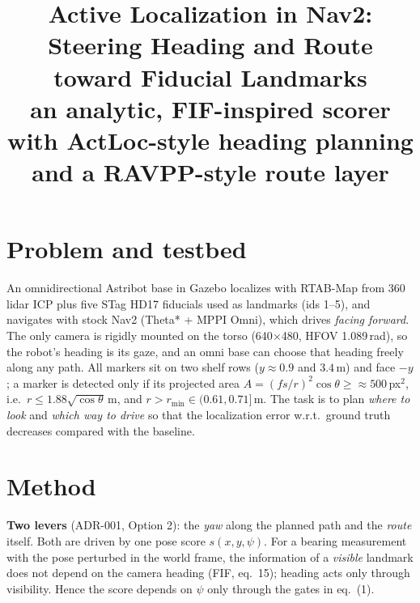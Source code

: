 \documentclass[10pt,twocolumn]{article}
\title{\vspace{-1.2cm}\large\bfseries Active Localization in Nav2: Steering Heading and Route toward Fiducial Landmarks\\[-2pt]
  {\normalsize\mdseries an analytic, FIF-inspired scorer with ActLoc-style heading planning and a RAVPP-style route layer}\vspace{-0.3cm}}
\author{\small \TODO{authors, affiliation, date, repository link; confirm subtitle (DIR)}}
\date{\vspace{-0.9cm}}
\begin{document}
\maketitle

\section{Problem and testbed}
An omnidirectional Astribot base in Gazebo localizes with RTAB-Map from 360\textdegree{} lidar ICP plus five STag HD17 fiducials used as landmarks (ids 1--5), and navigates with stock Nav2 (Theta* + MPPI Omni), which drives \emph{facing forward}.
The only camera is rigidly mounted on the torso (640$\times$480, HFOV 1.089\,rad), so the robot's heading is its gaze, and an omni base can choose that heading freely along any path.
All markers sit on two shelf rows ($y\approx0.9$ and $3.4$\,m) and face $-y$; a marker is detected only if its projected area $A=(fs/r)^2\cos\theta\ge{\approx}500$\,px$^2$, i.e.\ $r\le 1.88\sqrt{\cos\theta}$\,m, and $r>r_{\min}\in(0.61,0.71]$\,m.
The task is to plan \emph{where to look} and \emph{which way to drive} so that the localization error w.r.t.\ ground truth decreases compared with the baseline.

\section{Method}
\textbf{Two levers} (ADR-001, Option 2): the \emph{yaw} along the planned path and the \emph{route} itself. Both are driven by one pose score $s(x,y,\psi)$.
For a bearing measurement with the pose perturbed in the world frame, the information of a \emph{visible} landmark does not depend on the camera heading (FIF, eq.~15); heading acts only through visibility. Hence the score depends on $\psi$ only through the gates in eq.~(1).
\end{document}
